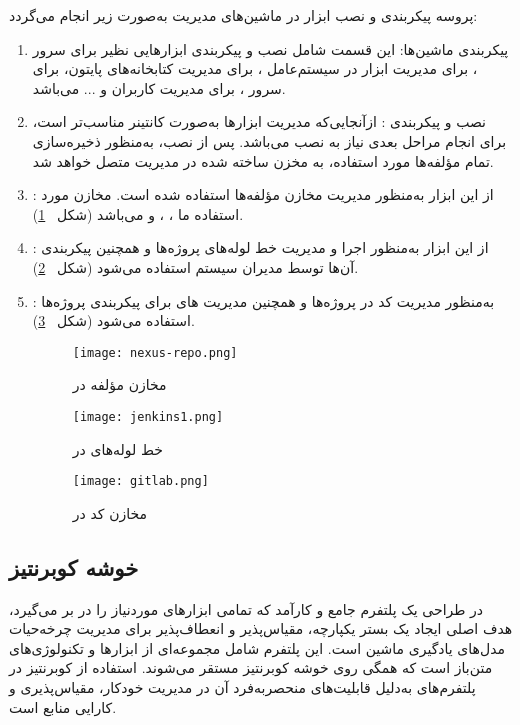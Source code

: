 پروسه پیکربندی و نصب ابزار در ماشین‌های مدیریت به‌صورت زیر انجام می‌گردد:
\begin{enumerate}
	\item 
	پیکربندی ماشین‌ها:
	این قسمت شامل نصب و پیکربندی ابزارهایی نظیر  برای سرور ،  برای مدیریت ابزار در سیستم‌عامل ،  برای مدیریت کتابخانه‌های پایتون،  برای سرور ،  برای مدیریت کاربران و ... می‌باشد.
	\item
	نصب و پیکربندی :
	ازآنجایی‌که مدیریت ابزارها به‌صورت کانتینر مناسب‌تر است، برای انجام مراحل بعدی نیاز به نصب  می‌باشد. پس از نصب، به‌منظور ذخیره‌سازی تمام مؤلفه‌ها مورد استفاده، به مخزن ساخته شده در  مدیریت متصل خواهد شد.
	\item 
	:
	از این ابزار به‌منظور مدیریت مخازن مؤلفه‌ها استفاده شده است. مخازن مورد استفاده ما ، ،  و  می‌باشد (شکل ~\ref{fig: nexus repo}).
	
	\item 
	:
	از این ابزار به‌منظور اجرا و مدیریت خط لوله‌های  پروژه‌ها و همچنین پیکربندی آن‌ها توسط مدیران سیستم استفاده می‌شود (شکل ~\ref{fig: jenkins}).
	
	\item 
	:
	به‌منظور مدیریت کد در پروژه‌ها و همچنین مدیریت های  برای پیکربندی پروژه‌ها استفاده می‌شود (شکل ~\ref{fig: gitlab}).
	
	\begin{figure}[t]
		\centering
		\texttt{[image: nexus-repo.png]}
		\caption{مخازن مؤلفه در }
		\label{fig: nexus repo}
	\end{figure}
	\begin{figure}[t]
		\centering
		\texttt{[image: jenkins1.png]}
		\caption{خط لوله‌های  در }
		\label{fig: jenkins}
	\end{figure}
	\begin{figure}[t]
		\centering
		\texttt{[image: gitlab.png]}
		\caption{مخازن کد در }
		\label{fig: gitlab}
	\end{figure}
\end{enumerate}


\subsection{خوشه کوبرنتیز}
در طراحی یک پلتفرم  جامع و کارآمد که تمامی ابزارهای موردنیاز را در بر می‌گیرد، هدف اصلی ایجاد یک بستر یکپارچه، مقیاس‌پذیر و انعطاف‌پذیر برای مدیریت چرخه‌حیات مدل‌های یادگیری ماشین است. این پلتفرم شامل مجموعه‌ای از ابزارها و تکنولوژی‌های متن‌باز است که همگی روی خوشه کوبرنتیز مستقر می‌شوند. استفاده از کوبرنتیز در پلتفرم‌های  به‌دلیل قابلیت‌های منحصربه‌فرد آن در مدیریت خودکار، مقیاس‌پذیری و کارایی منابع است. 

